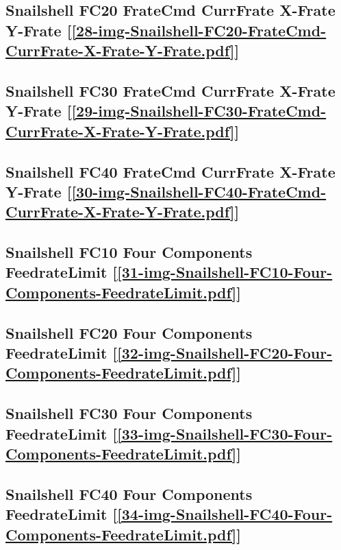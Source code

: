 \subsection       {Snailshell FC20 FrateCmd CurrFrate X-Frate Y-Frate
	[\ref      {28-img-Snailshell-FC20-FrateCmd-CurrFrate-X-Frate-Y-Frate.pdf}] }
\label{ssec-28-img-Snailshell-FC20-FrateCmd-CurrFrate-X-Frate-Y-Frate.pdf}

\subsection       {Snailshell FC30 FrateCmd CurrFrate X-Frate Y-Frate
	[\ref      {29-img-Snailshell-FC30-FrateCmd-CurrFrate-X-Frate-Y-Frate.pdf}] }
\label{ssec-29-img-Snailshell-FC30-FrateCmd-CurrFrate-X-Frate-Y-Frate.pdf}

\subsection       {Snailshell FC40 FrateCmd CurrFrate X-Frate Y-Frate
	[\ref      {30-img-Snailshell-FC40-FrateCmd-CurrFrate-X-Frate-Y-Frate.pdf}] }
\label{ssec-30-img-Snailshell-FC40-FrateCmd-CurrFrate-X-Frate-Y-Frate.pdf}

\subsection       {Snailshell FC10 Four Components FeedrateLimit
	[\ref      {31-img-Snailshell-FC10-Four-Components-FeedrateLimit.pdf}] }
\label{ssec-31-img-Snailshell-FC10-Four-Components-FeedrateLimit.pdf}

\subsection       {Snailshell FC20 Four Components FeedrateLimit
	[\ref      {32-img-Snailshell-FC20-Four-Components-FeedrateLimit.pdf}] }
\label{ssec-32-img-Snailshell-FC20-Four-Components-FeedrateLimit.pdf}

\subsection       {Snailshell FC30 Four Components FeedrateLimit
	[\ref      {33-img-Snailshell-FC30-Four-Components-FeedrateLimit.pdf}] }
\label{ssec-33-img-Snailshell-FC30-Four-Components-FeedrateLimit.pdf}

\subsection       {Snailshell FC40 Four Components FeedrateLimit
	[\ref      {34-img-Snailshell-FC40-Four-Components-FeedrateLimit.pdf}]}
\label{ssec-34-img-Snailshell-FC40-Four-Components-FeedrateLimit.pdf}

